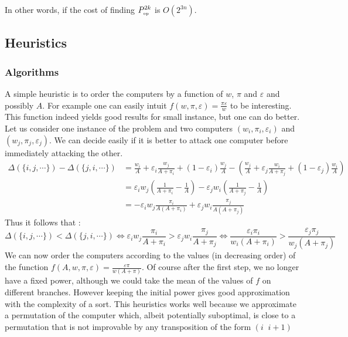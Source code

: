 \documentclass[11pt]{llncs}
\begin{document}
In other words, if the cost of finding $P_{\mbox{{\tiny op}}}^{2k}$ is $O(2^{3n})$.






	\subsection{Heuristics}
		\subsubsection{Algorithms}		
		A simple heuristic is to order the computers by a function of $w$, $\pi$ and $\varepsilon$ and possibly $A$. For example one can easily intuit $f(w, \pi, \varepsilon) = \frac{\pi\varepsilon}{w}$ to be interesting. This function indeed yields good results for small instance, but one can do better.
		Let us consider one instance of the problem and two computers $(w_i,\pi_i,\varepsilon_i)$ and $(w_j,\pi_j,\varepsilon_j)$. We can decide easily if it is better to attack one computer before immediately attacking the other.
		\begin{align*}
			\Delta( \{ i, j, \cdots \}) - 	\Delta( \{ j, i, \cdots \}) &=  \frac{w_i}{A} + \varepsilon_i \frac{w_j}{A + \pi_i} + (1 - \varepsilon_i) \frac{w_j}{A} - \left ( \frac{w_j}{A} + \varepsilon_j \frac{w_i}{A + \pi_j} + (1 - \varepsilon_j ) \frac{w_i}{A} \right ) \\
										&=   \varepsilon_i w_j \left ( \frac{1}{A + \pi_i} -\frac{1}{A} \right ) - \varepsilon_j w_i \left ( \frac{1}{A + \pi_j} -\frac{1}{A} \right )\\ 
										&= - \varepsilon_i w_j  \frac{\pi_i}{A(A + \pi_i )} + \varepsilon_j w_i  \frac{\pi_j}{A(A + \pi_j )} 
		\end{align*}
		Thus it follows that : \[ \Delta( \{ i, j, \cdots \}) < \Delta( \{ j, i, \cdots \}) \Leftrightarrow \varepsilon_i w_j  \frac{\pi_i}{A + \pi_i} > \varepsilon_j w_i  \frac{\pi_j}{A + \pi_j} \Leftrightarrow \frac{\varepsilon_i \pi_i}{w_i(A + \pi_i)} >  \frac{\varepsilon_j \pi_j}{w_j(A + \pi_j)} \]
		We can now order the computers according to the values (in decreasing order) of the function $f(A,w,\pi, \varepsilon) =\frac{\varepsilon \pi}{w(A + \pi)}$. Of course after the first step, we no longer have a fixed power, although we could take the mean of the values of $f$ on different branches. However keeping the initial power gives good approximation with the complexity of a sort.
		This heuristics works well because we approximate a permutation of the computer which, albeit potentially suboptimal, is close to a permutation that is not improvable by any transposition of the form $(i\;\; i+1)$
		
\end{document}
